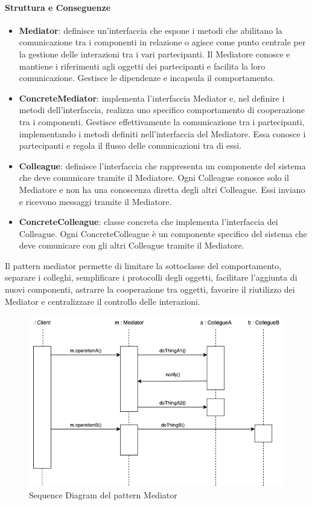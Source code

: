 \paragraph{Struttura e Conseguenze} 
\begin{itemize}
    \item \textbf{Mediator}: definisce un’interfaccia che espone i metodi che abilitano la comunicazione tra i componenti in relazione o agisce come punto centrale per la gestione delle interazioni tra i vari partecipanti. Il Mediatore conosce e mantiene i riferimenti agli oggetti dei partecipanti e facilita la loro comunicazione. Gestisce le dipendenze e incapsula il comportamento.
    \item \textbf{ConcreteMediator}: implementa l’interfaccia Mediator e, nel definire i metodi dell’interfaccia, realizza uno specifico comportamento di cooperazione tra i componenti. Gestisce effettivamente la comunicazione tra i partecipanti, implementando i metodi definiti nell'interfaccia del Mediatore. Essa conosce i partecipanti e regola il flusso delle comunicazioni tra di essi.
    \item \textbf{Colleague}: definisce l’interfaccia che rappresenta un componente del sistema che deve comunicare tramite il Mediatore. Ogni Colleague conosce solo il Mediatore e non ha una conoscenza diretta degli altri Colleague. Essi inviano e ricevono messaggi tramite il Mediatore.
    \item \textbf{ConcreteColleague}: classe concreta che implementa l'interfaccia dei Colleague. Ogni ConcreteColleague è un componente specifico del sistema che deve comunicare con gli altri Colleague tramite il Mediatore.
\end{itemize}

Il pattern mediator permette di limitare la sottoclasse del comportamento, separare i colleghi, semplificare i protocolli degli oggetti, facilitare l’aggiunta di nuovi componenti, astrarre la cooperazione tra oggetti, favorire il riutilizzo dei Mediator e centralizzare il controllo delle interazioni.

\begin{figure}[H]
    \centering
    \includegraphics[width=0.8\linewidth]{assets/pattern/mediator/mediator-sequence.drawio.png}
    \caption{Sequence Diagram del pattern Mediator}
\end{figure}

